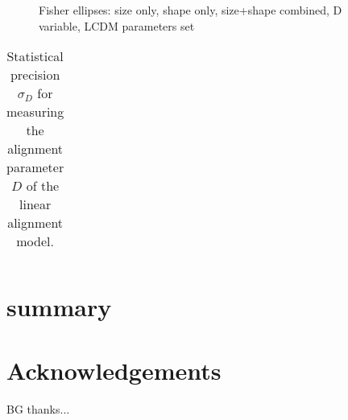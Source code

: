 \documentclass[a4paper,fleqn,usenatbib]{mnras}
\begin{document}
\begin{figure}
\centering
\caption{Fisher ellipses: size only, shape only, size+shape combined, D variable, LCDM parameters set}
\label{fig:fisher}
\end{figure}


\begin{table}
\center
\begin{tabular}{cc}
\hline\hline\\
\hline
\end{tabular}
\caption{Statistical precision $\sigma_D$ for measuring the alignment parameter $D$ of the linear alignment model.}
\label{tab_precision}
\end{table}


\section{summary}\label{sect_summary}



\section*{Acknowledgements}
BG thanks...






\bsp
\label{lastpage}
\end{document}
